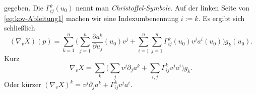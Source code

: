 gegeben. Die $\Gamma_{ij}^k(u_0)$ nennt man \emph{Christoffel-Symbole}.
Auf der linken Seite von \eqref{eq:kov-Ableitung1} machen wir eine
Indexumbenennung $i:=k$. Es ergibt sich schließlich
\begin{equation}
(\nabla_v X)(p)
= \sum_{k=1}^n \bigg(\sum_{j=1}^n \frac{\partial a^k}{\partial u_j}(u_0)v^j
+\sum_{i=1}^n\sum_{j=1}^n \Gamma_{ij}^k(u_0) v^j a^i(u_0)\bigg)g_k(u_0).
\end{equation}
Kurz
\begin{equation}
\nabla_v X = \sum_k \bigg(\sum_j v^j\partial_j a^k
+\sum_{i,j} \Gamma_{ij}^k v^j a^i\bigg)g_k.
\end{equation}
Oder kürzer $(\nabla_v X)^k = v^j \partial_j a^k + \Gamma_{ij}^k v^j a^i$.
